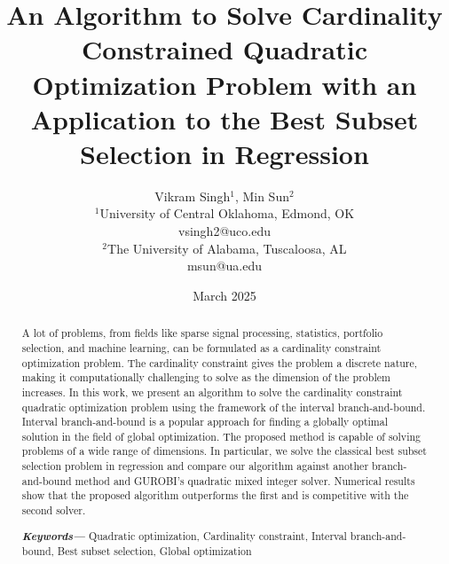 \documentclass[10pt, letterpaper]{article}
\title{An Algorithm to Solve Cardinality Constrained Quadratic Optimization Problem with an Application to the Best Subset Selection in Regression}
\author{Vikram Singh$^{1}$, Min Sun$^{2}$  \\
        \small $^{1}$University of Central Oklahoma, Edmond, OK \\
                 \small  vsingh2@uco.edu \\
        \small $^{2}$The University of Alabama, Tuscaloosa, AL \\
                 \small msun@ua.edu\\
}
\date{March 2025} %
\providecommand{\keywords}[1]
{
  \small	
  \textbf{\textit{Keywords---}} #1
}
\begin{document}
\maketitle

\begin{abstract}
A lot of problems, from fields like sparse signal processing, statistics, portfolio selection, and machine learning, can be formulated as a cardinality constraint optimization problem. The cardinality constraint gives the problem a discrete nature, making it computationally challenging to solve as the dimension of the problem increases. In this work, we present an algorithm to solve the cardinality constraint quadratic optimization problem using the framework of the interval branch-and-bound. Interval branch-and-bound is a popular approach for finding a globally optimal solution in the field of global optimization. The proposed method is capable of solving problems of a wide range of dimensions.  
In particular, we solve the classical best subset selection problem in regression and compare our algorithm against another branch-and-bound method and GUROBI's quadratic mixed integer solver. Numerical results show that the proposed algorithm outperforms the first and is competitive with the second solver.
\keywords{Quadratic optimization, Cardinality constraint, Interval branch-and-bound, Best subset selection, Global optimization}
\end{abstract}
\end{document}
